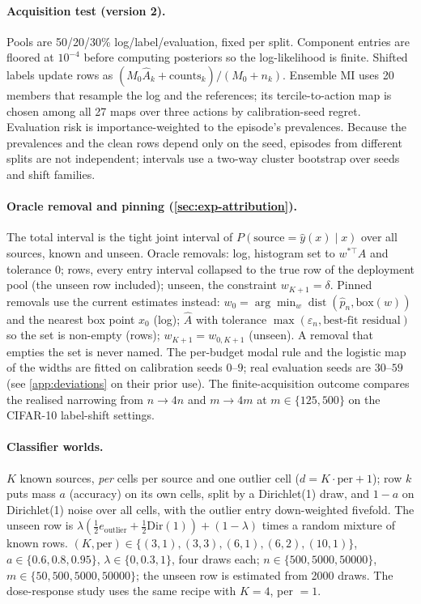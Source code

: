 \paragraph{Acquisition test (version 2).} Pools are 50/20/30\% log/label/evaluation, fixed per split.
Component entries are floored at $10^{-4}$ before computing posteriors so the log-likelihood is
finite. Shifted labels update rows as $(M_0\hat A_k+\text{counts}_k)/(M_0+n_k)$. Ensemble MI uses 20
members that resample the log and the references; its tercile-to-action map is chosen among all 27 maps
over three actions by calibration-seed regret. Evaluation risk is importance-weighted to the episode's
prevalences. Because the prevalences and the clean rows depend only on the seed, episodes from
different splits are not independent; intervals use a two-way cluster bootstrap over seeds and shift
families.

\paragraph{Oracle removal and pinning (\cref{sec:exp-attribution}).} The total interval is the tight
joint interval of $P(\text{source}=\hat y(x)\mid x)$ over all sources, known and unseen. Oracle removals:
log, histogram set to $w^{*\top}A$ and tolerance $0$; rows, every entry interval collapsed to the true row
of the deployment pool (the unseen row included); unseen, the constraint $w_{K+1}=\delta$. Pinned removals
use the current estimates instead: $w_0=\arg\min_w\operatorname{dist}(\hat p_n,\text{box}(w))$ and the
nearest box point $x_0$ (log); $\hat A$ with tolerance $\max(\varepsilon_n,\text{best-fit residual})$ so the
set is non-empty (rows); $w_{K+1}=w_{0,K+1}$ (unseen). A removal that empties the set is never named.
The per-budget modal rule and the logistic map of the widths are fitted on calibration seeds $0$--$9$; real
evaluation seeds are $30$--$59$ (see \cref{app:deviations} on their prior use). The finite-acquisition outcome compares the
realised narrowing from $n\to4n$ and $m\to4m$ at $m\in\{125,500\}$ on the CIFAR-10 label-shift settings.

\paragraph{Classifier worlds.} $K$ known sources, \emph{per} cells per source and one outlier cell
($d=K\cdot\text{per}+1$); row $k$ puts mass $a$ (accuracy) on its own cells, split by a Dirichlet(1) draw,
and $1-a$ on Dirichlet(1) noise over all cells, with the outlier entry down-weighted fivefold. The unseen
row is $\lambda(\tfrac12e_{\text{outlier}}+\tfrac12\text{Dir}(1))+(1-\lambda)$ times a random mixture of
known rows. $(K,\text{per})\in\{(3,1),(3,3),(6,1),(6,2),(10,1)\}$, $a\in\{0.6,0.8,0.95\}$,
$\lambda\in\{0,0.3,1\}$, four draws each; $n\in\{500,5000,50000\}$, $m\in\{50,500,5000,50000\}$; the unseen
row is estimated from 2000 draws. The dose-response study uses the same recipe with $K=4$, per $=1$.

